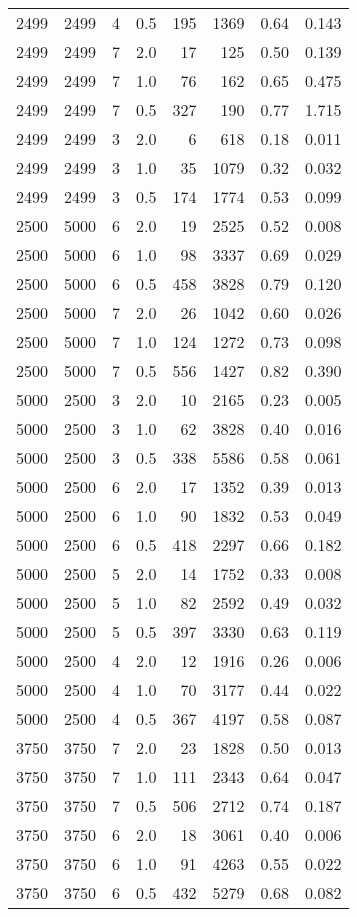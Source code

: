 \documentclass[11pt]{svjour3} \usepackage{fullpage}
\begin{document}
{\begin{tabular}[t]{@{}|c@{~~}c@{~~}c@{~}c@{~}r@{~}r@{~}c@{~}c|}
\\ 2499 & 2499 & 4 & 0.5 & 195 & 1369 & 0.64 & 0.143
\\ 2499 & 2499 & 7 & 2.0 & 17 & 125 & 0.50 & 0.139
\\ 2499 & 2499 & 7 & 1.0 & 76 & 162 & 0.65 & 0.475
\\ 2499 & 2499 & 7 & 0.5 & 327 & 190 & 0.77 & 1.715
\\ 2499 & 2499 & 3 & 2.0 & 6 & 618 & 0.18 & 0.011
\\ 2499 & 2499 & 3 & 1.0 & 35 & 1079 & 0.32 & 0.032
\\ 2499 & 2499 & 3 & 0.5 & 174 & 1774 & 0.53 & 0.099
\\ 2500 & 5000 & 6 & 2.0 & 19 & 2525 & 0.52 & 0.008
\\ 2500 & 5000 & 6 & 1.0 & 98 & 3337 & 0.69 & 0.029
\\ 2500 & 5000 & 6 & 0.5 & 458 & 3828 & 0.79 & 0.120
\\ 2500 & 5000 & 7 & 2.0 & 26 & 1042 & 0.60 & 0.026
\\ 2500 & 5000 & 7 & 1.0 & 124 & 1272 & 0.73 & 0.098
\\ 2500 & 5000 & 7 & 0.5 & 556 & 1427 & 0.82 & 0.390
\\ 5000 & 2500 & 3 & 2.0 & 10 & 2165 & 0.23 & 0.005
\\ 5000 & 2500 & 3 & 1.0 & 62 & 3828 & 0.40 & 0.016
\\ 5000 & 2500 & 3 & 0.5 & 338 & 5586 & 0.58 & 0.061
\\ 5000 & 2500 & 6 & 2.0 & 17 & 1352 & 0.39 & 0.013
\\ 5000 & 2500 & 6 & 1.0 & 90 & 1832 & 0.53 & 0.049
\\ 5000 & 2500 & 6 & 0.5 & 418 & 2297 & 0.66 & 0.182
\\ 5000 & 2500 & 5 & 2.0 & 14 & 1752 & 0.33 & 0.008
\\ 5000 & 2500 & 5 & 1.0 & 82 & 2592 & 0.49 & 0.032
\\ 5000 & 2500 & 5 & 0.5 & 397 & 3330 & 0.63 & 0.119
\\ 5000 & 2500 & 4 & 2.0 & 12 & 1916 & 0.26 & 0.006
\\ 5000 & 2500 & 4 & 1.0 & 70 & 3177 & 0.44 & 0.022
\\ 5000 & 2500 & 4 & 0.5 & 367 & 4197 & 0.58 & 0.087
\\ 3750 & 3750 & 7 & 2.0 & 23 & 1828 & 0.50 & 0.013
\\ 3750 & 3750 & 7 & 1.0 & 111 & 2343 & 0.64 & 0.047
\\ 3750 & 3750 & 7 & 0.5 & 506 & 2712 & 0.74 & 0.187
\\ 3750 & 3750 & 6 & 2.0 & 18 & 3061 & 0.40 & 0.006
\\ 3750 & 3750 & 6 & 1.0 & 91 & 4263 & 0.55 & 0.022
\\ 3750 & 3750 & 6 & 0.5 & 432 & 5279 & 0.68 & 0.082
\\ \hline
\end{tabular}

}
\end{document}

